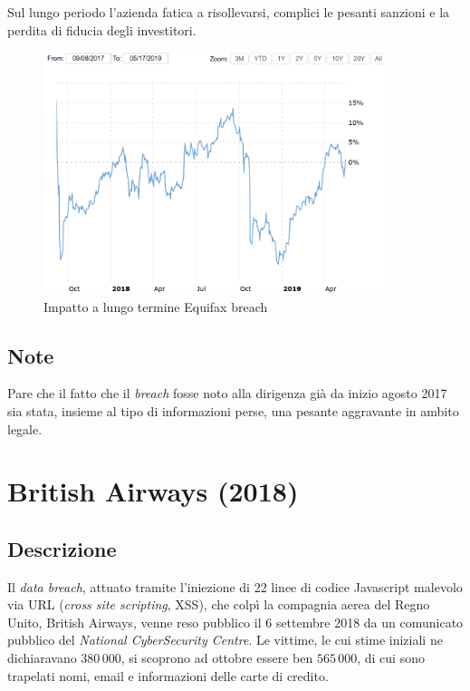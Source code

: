 \documentclass[12pt,a4paper,openright,twoside]{report}
\begin{document}
Sul lungo periodo l'azienda fatica a risollevarsi, complici le pesanti sanzioni e la perdita di fiducia degli investitori.\\

\begin{figure}[H] 
\begin{center} 
\includegraphics[width=10cm]{figures/equifax_long.png} 
\caption[Grafico Equifax long]{Impatto a lungo termine Equifax breach}\label{fig:eqx2}
\end{center}
\end{figure}

\subsection{Note}
Pare che il fatto che il \textit{breach} fosse noto alla dirigenza gi\`a da inizio agosto 2017\cite{Uber_plusEquifaxAndYahoo} sia stata, insieme al tipo di informazioni perse, una pesante aggravante in ambito legale.\\
\section{British Airways (2018)}
\subsection{Descrizione}
Il \textit{data breach}, attuato tramite l'iniezione di 22 linee di codice Javascript malevolo via URL (\textit{cross site scripting}, XSS), che colp\`i la compagnia aerea del Regno Unito, British Airways, venne reso pubblico il 6 settembre 2018 da un comunicato pubblico del \textit{National CyberSecurity Centre}. Le vittime, le cui stime iniziali ne dichiaravano $380\,000$, si scoprono ad ottobre essere ben $565\,000$, di cui sono trapelati nomi, email e informazioni delle carte di credito.\cite{BritAir} 
\end{document}
